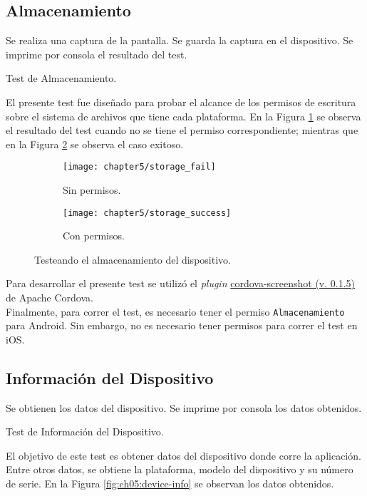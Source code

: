 \subsection{Almacenamiento}
\begin{algorithm}
	\begin{algorithmic}[1]
		\STATE Se realiza una captura de la pantalla.
		\STATE Se guarda la captura en el dispositivo.
		\STATE Se imprime por consola el resultado del test.
	\end{algorithmic}
	\caption{Test de Almacenamiento.}\label{alg:chap5_test_storage}
\end{algorithm}
El presente test fue diseñado para probar el alcance de los permisos de escritura sobre el sistema de archivos que tiene cada plataforma. En la Figura \ref{fig:ch05:storage_fail} se observa el resultado del test cuando no se tiene el permiso correspondiente; mientras que en la Figura \ref{fig:ch05:storage_success} se observa el caso exitoso.\\
\begin{figure}[hbtp]
   \centering
   	\begin{subfigure}{.3\linewidth}
		\texttt{[image: chapter5/storage\_fail]}
		\caption{Sin permisos.}
		\label{fig:ch05:storage_fail}
	\end{subfigure}
	\begin{subfigure}{.3\linewidth}
		\texttt{[image: chapter5/storage\_success]}
		\caption{Con permisos.}
		\label{fig:ch05:storage_success}
	\end{subfigure}
	\caption{Testeando el almacenamiento del dispositivo.}
	\label{fig:ch05:storage_test}
\end{figure}

Para desarrollar el presente test se utilizó el \textit{plugin} \href{https://github.com/gitawego/cordova-screenshot}{cordova-screenshot (v. 0.1.5)} de Apache Cordova.\\

Finalmente, para correr el test, es necesario tener el permiso \texttt{Almacenamiento} para Android. Sin embargo, no es necesario tener permisos para correr el test en iOS.
\subsection{Información del Dispositivo}
\begin{algorithm}
	\begin{algorithmic}[1]
		\STATE Se obtienen los datos del dispositivo.
		\STATE Se imprime por consola los datos obtenidos.
	\end{algorithmic}
	\caption{Test de Información del Dispositivo.}\label{alg:chap5_test_info}
\end{algorithm}
El objetivo de este test es obtener datos del dispositivo donde corre la aplicación. Entre otros datos, se obtiene la plataforma, modelo del dispositivo y su número de serie. En la Figura \ref{fig:ch05:device-info} se observan los datos obtenidos.\\

